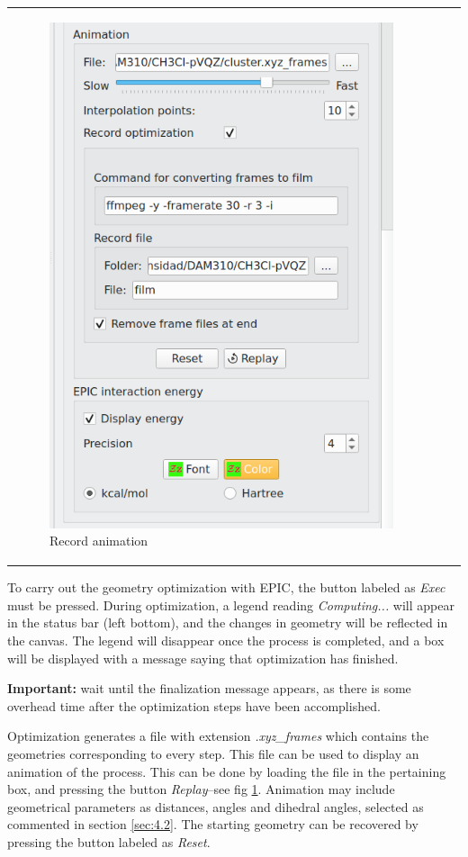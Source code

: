 \documentclass[10pt]{article}
\begin{document}
\begin{tabular}{lcr}
\begin{minipage}{.45\linewidth}
\begin{figure}[H]
\begin{center}
            \includegraphics[width=0.67\linewidth]{damqt320_mespimizer_6.png}
        \end{center}
        \caption{Record animation\label{fig:4_10_6}}
    \end{figure}
\end{minipage}
\end{tabular}

\vspace*{5mm}

To carry out the geometry optimization with EPIC, the button labeled as {\it Exec} must be pressed. During optimization, 
a legend reading {\it Computing...} will appear in the status bar (left bottom),
and the changes in geometry will be reflected in the canvas.
The legend will disappear once the process is completed, and a box
will be displayed with a message saying that optimization has finished.

{\bf Important:} wait until the finalization message appears, as
there is some overhead time after the optimization steps have been 
accomplished.

Optimization generates a file with extension
{\it .xyz\_frames} which contains the geometries corresponding to 
every step. This file can be used to display an animation of the
process. This can be done by loading the file in the pertaining box,
and pressing the button {\it Replay}--see fig \ref{fig:4_10_6}. Animation may include geometrical  
parameters as distances, angles and dihedral angles, selected as
commented in section \ref{sec:4.2}. 
The starting geometry can be recovered by pressing the button labeled
as {\it Reset}.
\end{document}
